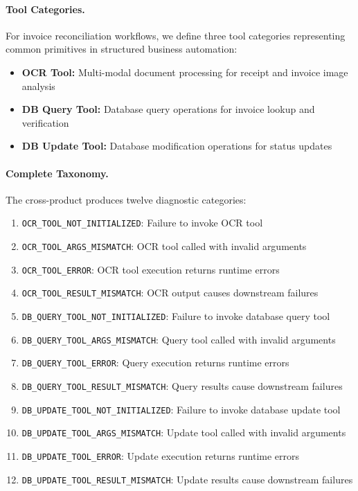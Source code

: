 \paragraph{Tool Categories.} For invoice reconciliation workflows, we define three tool categories representing common primitives in structured business automation:
\begin{itemize}[leftmargin=*]
    \item \textbf{OCR Tool:} Multi-modal document processing for receipt and invoice image analysis
    \item \textbf{DB Query Tool:} Database query operations for invoice lookup and verification
    \item \textbf{DB Update Tool:} Database modification operations for status updates
\end{itemize}

\paragraph{Complete Taxonomy.} The cross-product produces twelve diagnostic categories:

\begin{enumerate}[leftmargin=*]
    \item \texttt{OCR\_TOOL\_NOT\_INITIALIZED}: Failure to invoke OCR tool
    \item \texttt{OCR\_TOOL\_ARGS\_MISMATCH}: OCR tool called with invalid arguments
    \item \texttt{OCR\_TOOL\_ERROR}: OCR tool execution returns runtime errors
    \item \texttt{OCR\_TOOL\_RESULT\_MISMATCH}: OCR output causes downstream failures
    \item \texttt{DB\_QUERY\_TOOL\_NOT\_INITIALIZED}: Failure to invoke database query tool
    \item \texttt{DB\_QUERY\_TOOL\_ARGS\_MISMATCH}: Query tool called with invalid arguments
    \item \texttt{DB\_QUERY\_TOOL\_ERROR}: Query execution returns runtime errors
    \item \texttt{DB\_QUERY\_TOOL\_RESULT\_MISMATCH}: Query results cause downstream failures
    \item \texttt{DB\_UPDATE\_TOOL\_NOT\_INITIALIZED}: Failure to invoke database update tool
    \item \texttt{DB\_UPDATE\_TOOL\_ARGS\_MISMATCH}: Update tool called with invalid arguments
    \item \texttt{DB\_UPDATE\_TOOL\_ERROR}: Update execution returns runtime errors
    \item \texttt{DB\_UPDATE\_TOOL\_RESULT\_MISMATCH}: Update results cause downstream failures
\end{enumerate}

